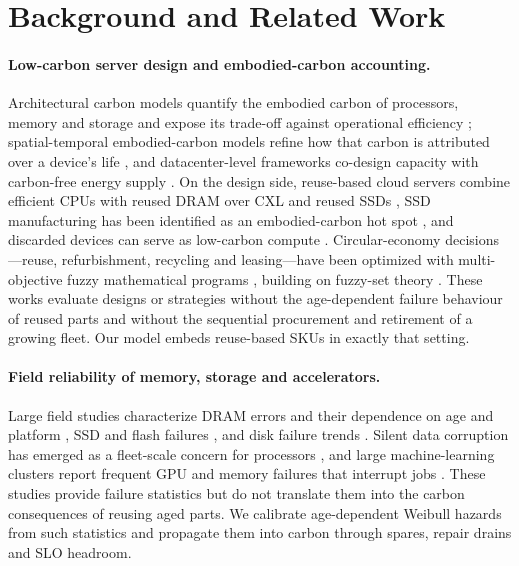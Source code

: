 \documentclass[11pt]{article}
\begin{document}
\section{Background and Related Work}
\paragraph{Low-carbon server design and embodied-carbon accounting.}
Architectural carbon models quantify the embodied carbon of processors, memory and storage and expose its trade-off against operational efficiency \citep{gupta2022act,gupta2022chasing}; spatial-temporal embodied-carbon models refine how that carbon is attributed over a device's life \citep{zhang2024spatialembodied}, and datacenter-level frameworks co-design capacity with carbon-free energy supply \citep{acun2023carbonexplorer}. On the design side, reuse-based cloud servers combine efficient CPUs with reused DRAM over CXL and reused SSDs \citep{wang2024greensku}, SSD manufacturing has been identified as an embodied-carbon hot spot \citep{tannu2023ssd}, and discarded devices can serve as low-carbon compute \citep{switzer2023junkyard}. Circular-economy decisions---reuse, refurbishment, recycling and leasing---have been optimized with multi-objective fuzzy mathematical programs \citep{poonia2024circular}, building on fuzzy-set theory \citep{zadeh1965fuzzy}. These works evaluate designs or strategies without the age-dependent failure behaviour of reused parts and without the sequential procurement and retirement of a growing fleet. Our model embeds reuse-based SKUs in exactly that setting.

\paragraph{Field reliability of memory, storage and accelerators.}
Large field studies characterize DRAM errors and their dependence on age and platform \citep{schroeder2009dram,sridharan2012dram,sridharan2015memory,meza2015dram,zivanovic2019dram,dramicdcs2024}, SSD and flash failures \citep{meza2015flash,schroeder2016flash,ssdsystor2016,ssdnas2024}, and disk failure trends \citep{pinheiro2007disk}. Silent data corruption has emerged as a fleet-scale concern for processors \citep{hochschild2021cores,dixit2021sdc,sdctaco2024}, and large machine-learning clusters report frequent GPU and memory failures that interrupt jobs \citep{llama3,kokolis2025reliability}. These studies provide failure statistics but do not translate them into the carbon consequences of reusing aged parts. We calibrate age-dependent Weibull hazards from such statistics and propagate them into carbon through spares, repair drains and SLO headroom.
\end{document}
